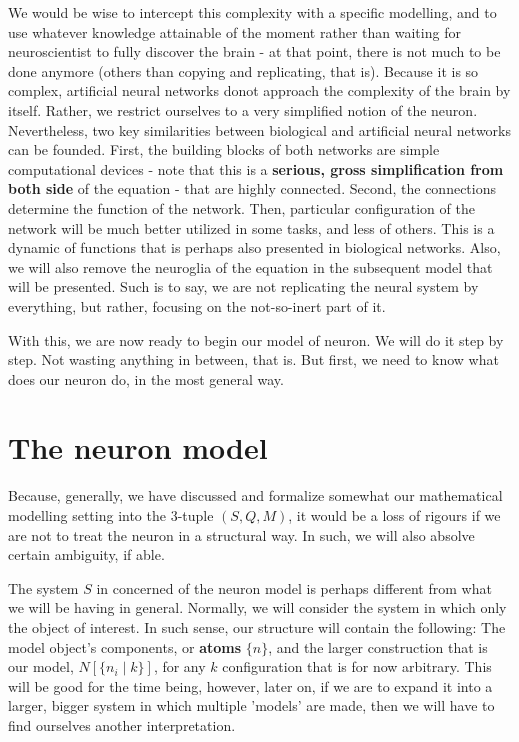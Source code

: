We would be wise to intercept this complexity with a specific modelling, and to use whatever knowledge attainable of the moment rather than waiting for neuroscientist to fully discover the brain - at that point, there is not much to be done anymore (others than copying and replicating, that is). Because it is so complex, artificial neural networks donot approach the complexity of the brain by itself. Rather, we restrict ourselves to a very simplified notion of the neuron. Nevertheless, two key similarities between biological and artificial neural networks can be founded. First, the building blocks of both networks are simple computational devices - note that this is a \textbf{serious, gross simplification from both side} of the equation - that are highly connected. Second, the connections determine the function of the network. Then, particular configuration of the network will be much better utilized in some tasks, and less of others. This is a dynamic of functions that is perhaps also presented in biological networks. Also, we will also remove the neuroglia of the equation in the subsequent model that will be presented. Such is to say, we are not replicating the neural system by everything, but rather, focusing on the not-so-inert part of it.

With this, we are now ready to begin our model of neuron. We will do it step by step. Not wasting anything in between, that is. But first, we need to know what does our neuron do, in the most general way. 

\section{The neuron model}

Because, generally, we have discussed and formalize somewhat our mathematical modelling setting into the 3-tuple $(S,Q,M)$, it would be a loss of rigours if we are not to treat the neuron in a structural way. In such, we will also absolve certain ambiguity, if able.  

The system $S$ in concerned of the neuron model is perhaps different from what we will be having in general. Normally, we will consider the system in which only the object of interest. In such sense, our structure will contain the following: The model object's components, or \textbf{atoms} $\{n\}$, and the larger construction that is our model, $N[\{n_{i}\mid k\}]$, for any $k$ configuration that is for now arbitrary. This will be good for the time being, however, later on, if we are to expand it into a larger, bigger system in which multiple 'models' are made, then we will have to find ourselves another interpretation. 

